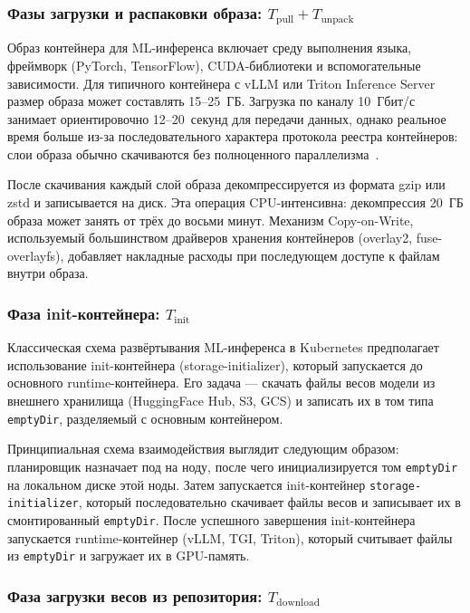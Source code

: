 \subsubsection{Фазы загрузки и распаковки образа: $T_{\mathrm{pull}} + T_{\mathrm{unpack}}$}

Образ контейнера для ML-инференса включает среду выполнения языка, фреймворк (PyTorch, TensorFlow), CUDA-библиотеки и вспомогательные зависимости. Для типичного контейнера с vLLM или Triton Inference Server размер образа может составлять 15--25~ГБ. Загрузка по каналу 10~Гбит/с занимает ориентировочно 12--20~секунд для передачи данных, однако реальное время больше из-за последовательного характера протокола реестра контейнеров: слои образа обычно скачиваются без полноценного параллелизма~\cite{bentoml2024cold}.

После скачивания каждый слой образа декомпрессируется из формата gzip или zstd и записывается на диск. Эта операция CPU-интенсивна: декомпрессия 20~ГБ образа может занять от трёх до восьми минут. Механизм Copy-on-Write, используемый большинством драйверов хранения контейнеров (overlay2, fuse-overlayfs), добавляет накладные расходы при последующем доступе к файлам внутри образа.

\subsubsection{Фаза init-контейнера: $T_{\mathrm{init}}$}

Классическая схема развёртывания ML-инференса в Kubernetes предполагает использование init-контейнера (storage-initializer), который запускается до основного runtime-контейнера. Его задача --- скачать файлы весов модели из внешнего хранилища (HuggingFace Hub, S3, GCS) и записать их в том типа \texttt{emptyDir}, разделяемый с основным контейнером.

Принципиальная схема взаимодействия выглядит следующим образом: планировщик назначает под на ноду, после чего инициализируется том \texttt{emptyDir} на локальном диске этой ноды. Затем запускается init-контейнер \texttt{storage-initializer}, который последовательно скачивает файлы весов и записывает их в смонтированный \texttt{emptyDir}. После успешного завершения init-контейнера запускается runtime-контейнер (vLLM, TGI, Triton), который считывает файлы из \texttt{emptyDir} и загружает их в GPU-память.

\subsubsection{Фаза загрузки весов из репозитория: $T_{\mathrm{download}}$}


